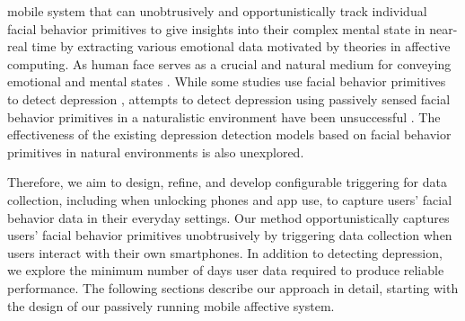 mobile system that can unobtrusively and opportunistically track individual facial behavior primitives to give insights into their complex mental state in near-real time by extracting various emotional data motivated by theories in affective computing. As human face serves as a crucial and natural medium for conveying emotional and mental states \cite{el2005real}. While some studies use facial behavior primitives to detect depression \cite{song2020spectral, valstar2014avec}, attempts to detect depression using passively sensed facial behavior primitives in a naturalistic environment have been unsuccessful \cite{wang2015using}. The effectiveness of the existing depression detection models based on facial behavior primitives in natural environments is also unexplored. 


Therefore, we aim to design, refine, and develop configurable triggering for data collection, including when unlocking phones and app use, to capture users' facial behavior data in their everyday settings. Our method opportunistically captures users' facial behavior primitives unobtrusively by triggering data collection when users interact with their own smartphones. In addition to detecting depression, we explore the minimum number of days user data required to produce reliable performance. The following sections describe our approach in detail, starting with the design of our passively running mobile affective system.



